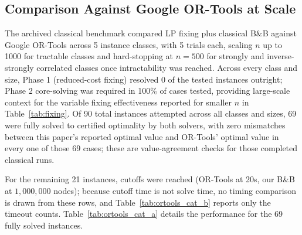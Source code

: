 \documentclass[pdflatex,sn-mathphys-num]{sn-jnl}
\begin{document}
\subsection{Comparison Against Google OR-Tools at Scale}

The archived classical benchmark compared LP fixing plus classical B\&B against Google OR-Tools across 5 instance classes, with 5 trials each, scaling $n$ up to 1000 for tractable classes and hard-stopping at $n=500$ for strongly and inverse-strongly correlated classes once intractability was reached. Across every class and size, Phase 1 (reduced-cost fixing) resolved 0 of the tested instances outright; Phase 2 core-solving was required in 100\% of cases tested, providing large-scale context for the variable fixing effectiveness reported for smaller $n$ in Table~\ref{tab:fixing}. Of 90 total instances attempted across all classes and sizes, 69 were fully solved to certified optimality by both solvers, with zero mismatches between this paper's reported optimal value and OR-Tools' optimal value in every one of those 69 cases; these are value-agreement checks for those completed classical runs.

For the remaining 21 instances, cutoffs were reached (OR-Tools at 20s, our B\&B at $1{,}000{,}000$ nodes); because cutoff time is not solve time, no timing comparison is drawn from these rows, and Table~\ref{tab:ortools_cat_b} reports only the timeout counts. Table~\ref{tab:ortools_cat_a} details the performance for the 69 fully solved instances.
\end{document}
